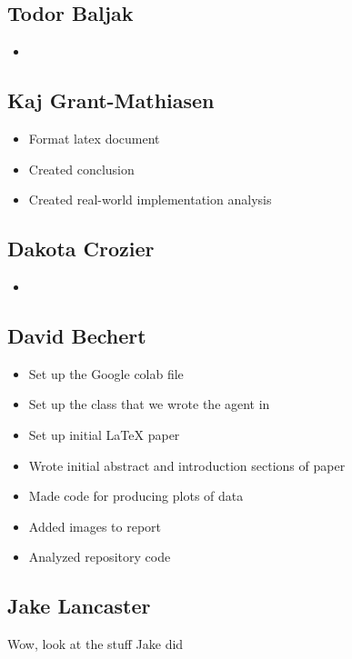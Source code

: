 \documentclass{article} %
\begin{document}
\begin{multicols}{2}

\subsection{Todor Baljak}
\begin{itemize}[itemsep=-2pt,topsep=-5pt, leftmargin=10pt]
\item 
\end{itemize}

\subsection{Kaj Grant-Mathiasen}
\begin{itemize}[itemsep=-2pt,topsep=-5pt, leftmargin=10pt]
\item Format latex document
\item Created conclusion
\item Created real-world implementation analysis
\end{itemize}

\subsection{Dakota Crozier}
\begin{itemize}[itemsep=-2pt,topsep=-5pt, leftmargin=10pt]
\item 
\end{itemize}

\columnbreak

\subsection{David Bechert}
\begin{itemize}[itemsep=-2pt,topsep=-5pt, leftmargin=10pt]
\item Set up the Google colab file
\item Set up the class that we wrote the agent in
\item Set up initial LaTeX paper
\item Wrote initial abstract and introduction sections of paper
\item Made code for producing plots of data
\item Added images to report
\item Analyzed repository code
\end{itemize}

\subsection{Jake Lancaster}
Wow, look at the stuff Jake did 

\end{multicols}
\end{document}
